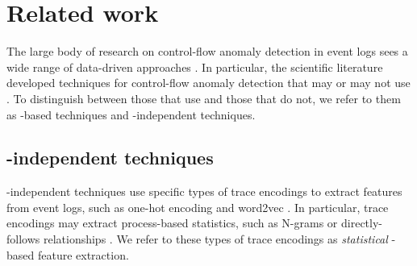 \section{Related work}
\label{sec:related_work}
The large body of research on control-flow anomaly detection in event logs sees a wide range of data-driven approaches \cite{ko2023adsystematicreview}. In particular, the scientific literature developed techniques for control-flow anomaly detection that may or may not use . To distinguish between those that use  and those that do not, we refer to them as -based techniques and -independent techniques. 


\subsection{-independent techniques}
-independent techniques use specific types of trace encodings to extract features from event logs, such as one-hot encoding and word2vec \cite{ko2023adsystematicreview}. In particular, trace encodings may extract process-based statistics, such as N-grams or directly-follows relationships \cite{tavares2023pmtraceencoding}. We refer to these types of trace encodings as \textit{statistical} -based feature extraction.

